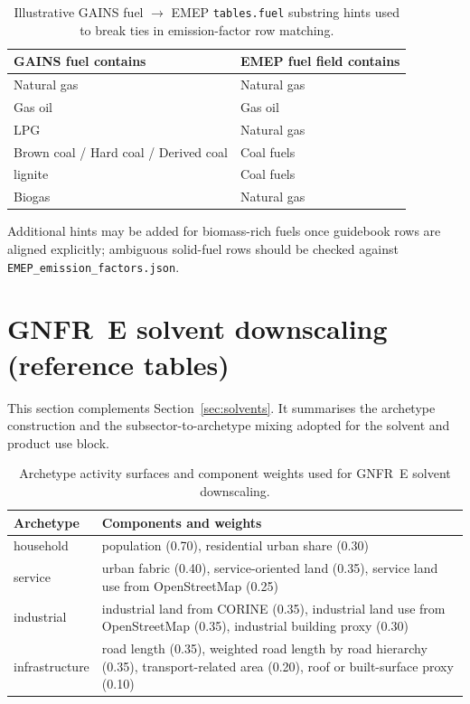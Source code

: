 \begin{table}[htbp]
  \centering
  \caption{Illustrative GAINS fuel $\rightarrow$ EMEP \texttt{tables.fuel}
    substring hints used to break ties in emission-factor row matching.}
  \label{tab:rescom_emep_fuel_hints}
  \footnotesize
  \begin{tabular}{p{4.5cm}p{7.5cm}}
    \hline
    GAINS fuel contains & EMEP fuel field contains \\
    \hline
    Natural gas & Natural gas \\
    Gas oil & Gas oil \\
    LPG & Natural gas \\
    Brown coal / Hard coal / Derived coal & Coal fuels \\
    lignite & Coal fuels \\
    Biogas & Natural gas \\
    \hline
  \end{tabular}

  \medskip
  \footnotesize
  Additional hints may be added for biomass-rich fuels once guidebook rows are
  aligned explicitly; ambiguous solid-fuel rows should be checked against
  \texttt{EMEP\_emission\_factors.json}.
\end{table}

\section{GNFR~E solvent downscaling (reference tables)}
\label{app:solvents_downscaling}

This section complements Section~\ref{sec:solvents}. It summarises the
archetype construction and the subsector-to-archetype mixing adopted for
the solvent and product use block.

\begin{table}[htbp]
  \centering
  \caption{Archetype activity surfaces and component weights used for
    GNFR~E solvent downscaling.}
  \label{tab:solvents_archetypes}
  \footnotesize
  \begin{tabular}{p{2.2cm}p{8.8cm}}
    \hline
    Archetype & Components and weights \\
    \hline
    household &
    population (0.70), residential urban share (0.30) \\
    service &
    urban fabric (0.40), service-oriented land (0.35), service land use from
    OpenStreetMap (0.25) \\
    industrial &
    industrial land from CORINE (0.35), industrial land use from
    OpenStreetMap (0.35), industrial building proxy (0.30) \\
    infrastructure &
    road length (0.35), weighted road length by road hierarchy (0.35),
    transport-related area (0.20), roof or built-surface proxy (0.10) \\
    \hline
  \end{tabular}
\end{table}

